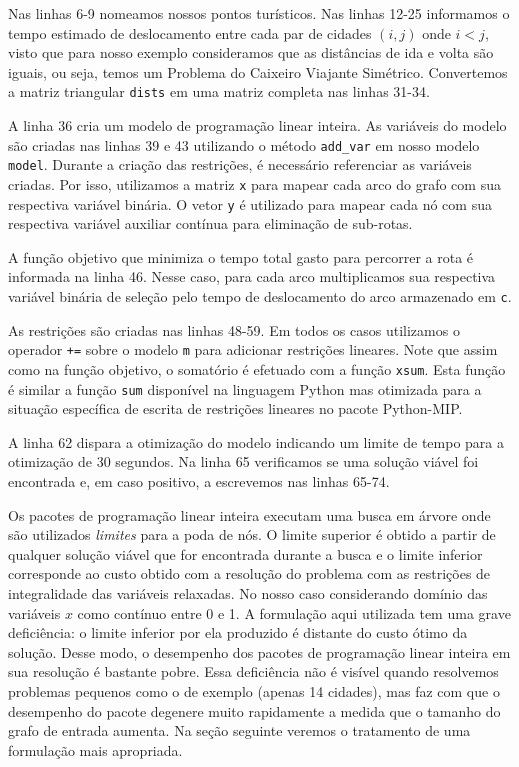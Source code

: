 \documentclass[a4paper,11pt,fleqn]{article}
\begin{document}
Nas linhas 6-9 nomeamos nossos pontos turísticos. 
Nas linhas 12-25 informamos o tempo estimado de deslocamento entre cada par de cidades $(i, j)$ onde $i<j$, visto que para nosso exemplo consideramos que as distâncias de ida e volta são iguais, ou seja, temos um Problema do Caixeiro Viajante Simétrico. 
Convertemos a matriz triangular \texttt{dists} em uma matriz completa nas linhas 31-34.

A linha 36 cria um modelo de programação linear inteira. 
As variáveis do modelo são criadas nas linhas 39 e 43 utilizando o método \texttt{add\_var} em nosso modelo \texttt{model}. 
Durante a criação das restrições, é necessário referenciar as variáveis criadas. 
Por isso, utilizamos a matriz \texttt{x} para mapear cada arco do grafo com sua respectiva variável binária.
O vetor \texttt{y} é utilizado para mapear cada nó com sua respectiva variável auxiliar contínua para eliminação de sub-rotas.

A função objetivo que minimiza o tempo total gasto para percorrer a rota é informada na linha 46. 
Nesse caso, para cada arco multiplicamos sua respectiva variável binária de seleção pelo tempo de deslocamento do arco armazenado em \texttt{c}.

As restrições são criadas nas linhas 48-59. Em todos os casos utilizamos o operador \texttt{+=} sobre o modelo \texttt{m} para adicionar restrições lineares. Note que assim como na função objetivo, o somatório é efetuado com a função \texttt{xsum}. Esta função é similar a função \texttt{sum} disponível na linguagem Python mas otimizada para a situação específica de escrita de restrições lineares no pacote Python-MIP\@. 

A linha 62 dispara a otimização do modelo indicando um limite de tempo para a otimização de 30 segundos. Na linha 65 verificamos se uma solução viável foi encontrada e, em caso positivo, a escrevemos nas linhas 65-74.

Os pacotes de programação linear inteira executam uma busca em árvore onde são utilizados \emph{limites} para a poda de nós. O limite superior é obtido a partir de qualquer solução viável que for encontrada durante a busca e o limite inferior corresponde ao custo obtido com a resolução do problema com as restrições de integralidade das variáveis relaxadas. No nosso caso considerando domínio das variáveis $x$ como contínuo entre 0 e 1. A formulação aqui utilizada tem uma grave deficiência: o limite inferior por ela produzido é distante do custo ótimo da solução. Desse modo, o desempenho dos pacotes de programação linear inteira em sua resolução é bastante pobre. Essa deficiência não é visível quando resolvemos problemas pequenos como o de exemplo (apenas 14 cidades), mas faz com que o desempenho do pacote degenere muito rapidamente a medida que o tamanho do grafo de entrada aumenta. Na seção seguinte veremos o tratamento de uma formulação mais apropriada.
\end{document}
